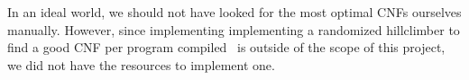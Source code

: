 In an ideal world, we should not have looked for the most optimal CNFs ourselves
manually. However, since implementing implementing a randomized hillclimber to
find a good CNF per program compiled~\cite{AdaptvStratInlSubst} is outside of
the scope of this project, we did not have the resources to implement one.
